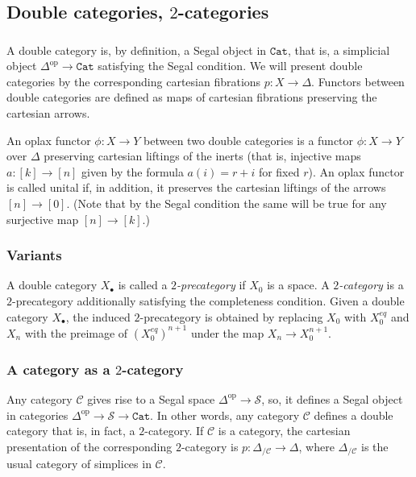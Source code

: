 \documentclass[12pt]{amsart}%
\newcommand{\Cat}{\mathtt{Cat}}
\newcommand{\eq}{\mathit{eq}}
\newcommand{\op}{\mathrm{op}}
\newcommand{\cC}{\mathcal{C}}
\newcommand{\cS}{\mathcal{S}}
\begin{document}
\subsection{Double categories, $2$-categories}
\label{ss:double}

\subsubsection{}

A double category is, by definition, a Segal object in $\Cat$, that is,
a simplicial object $\Delta^\op\to\Cat$ satisfying
the Segal condition. We will present double categories by the
corresponding cartesian fibrations $p:X\to\Delta$. Functors between double 
categories are defined as maps of cartesian fibrations preserving
the cartesian arrows.

An oplax functor $\phi:X\to Y$ between two double categories is a 
functor $\phi:X\to Y$ over $\Delta$ preserving cartesian liftings of the 
inerts (that is, injective maps $a:[k]\to [n]$ given by the formula
$a(i)=r+i$ for fixed $r$). An oplax functor is called unital if, in addition, it preserves the cartesian liftings of the arrows
$[n]\to[0]$. (Note that by the Segal condition the same will be true for any surjective map
$[n]\to[k]$.)


\subsubsection{Variants}

A double category $X_\bullet$ is called  a 
{\sl $2$-precategory} if $X_0$ is a space.  
	A {\sl $2$-category} is a $2$-precategory additionally satisfying the completeness condition.   
Given a double category $X_\bullet$, the induced   $2$-precategory is obtained by replacing $X_0$ with $X_0^\eq$ and $X_n$ with the preimage
of $(X^\eq_0)^{n+1}$ under the map $X_n\to X_0^{n+1}$.

\subsubsection{A category  as a $2$-category}
\label{sss:cat-2cat}

Any category $\cC$ gives rise to a Segal space $\Delta^\op\to\cS$, so,
it defines a Segal object in categories $\Delta^\op\to\cS\to\Cat$.
In other words, any category $\cC$  defines a  double category that is, in fact, a $2$-category. If $\cC$ is a category, the cartesian presentation of the corresponding $2$-category is $p:\Delta_{/\cC}\to\Delta$, where 
$\Delta_{/\cC}$ is the usual category of simplices in $\cC$.
  
\end{document}
